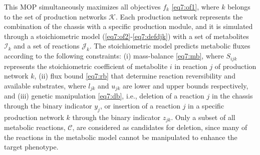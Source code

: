 \documentclass[12pt]{article}
\begin{document}
This MOP simultaneously maximizes all objectives $f_k$ \eqref{eq7:of1}, where $k$ belongs to the set of production networks $\mathcal{K}$.
Each production network represents the combination of the chassis with a specific production module, and it is simulated through a stoichiometric model\citep{palsson2015} (\ref{eq7:of2}-\ref{eq7:defdjk}) with a set of metabolites $\mathcal{I}_k$ and a set of reactions $\mathcal{J}_k$.
The stoichiometric model predicts metabolic fluxes according to the following constraints:
(i) mass-balance \eqref{eq7:mb}, where $S_{ijk}$ represents the stoichiometric coefficient of metabolite $i$ in reaction $j$ of production network $k$, (ii) flux bound \eqref{eq7:rb} that determine reaction reversibility and available substrates, where $l_{jk}$ and $u_{jk}$ are lower and upper bounds respectively, and (iii) genetic manipulation \eqref{eq7:db}, i.e., deletion of a reaction $j$ in the chassis through the binary indicator $y_{j}$, or insertion of a reaction $j$ in a specific production network $k$ through the binary indicator $z_{jk}$.
Only a subset of all metabolic reactions, $\mathcal{C}$, are considered as candidates for deletion, since many of the reactions in the metabolic model cannot be manipulated to enhance the target phenotype.
\end{document}
